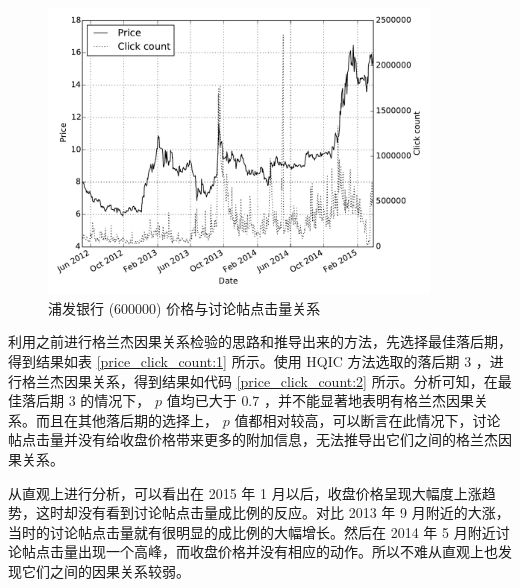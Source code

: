 \begin{figure}
  \centering
  \includegraphics[width=0.9\textwidth]{plots/price_click_count_line.pdf}
  \caption{浦发银行 (600000) 价格与讨论帖点击量关系}
  \label{price_click_count:0}
\end{figure}

利用之前进行格兰杰因果关系检验的思路和推导出来的方法，先选择最佳落后期，得到结果如表 \ref{price_click_count:1} 所示。使用 HQIC 方法选取的落后期 $3$ ，进行格兰杰因果关系，得到结果如代码 \ref{price_click_count:2} 所示。分析可知，在最佳落后期 $3$ 的情况下， $p$ 值均已大于 $0.7$ ，并不能显著地表明有格兰杰因果关系。而且在其他落后期的选择上， $p$ 值都相对较高，可以断言在此情况下，讨论帖点击量并没有给收盘价格带来更多的附加信息，无法推导出它们之间的格兰杰因果关系。

从直观上进行分析，可以看出在 2015 年 1 月以后，收盘价格呈现大幅度上涨趋势，这时却没有看到讨论帖点击量成比例的反应。对比 2013 年 9 月附近的大涨，当时的讨论帖点击量就有很明显的成比例的大幅增长。然后在 2014 年 5 月附近讨论帖点击量出现一个高峰，而收盘价格并没有相应的动作。所以不难从直观上也发现它们之间的因果关系较弱。

